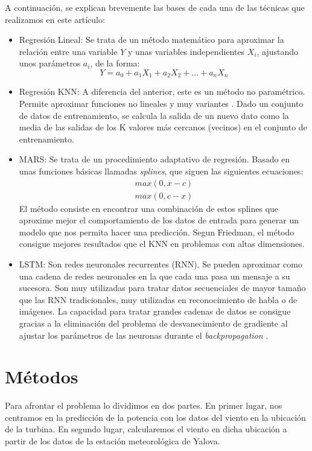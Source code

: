 \documentclass[journal]{IEEEtran}
\begin{document}
A continuación, se explican brevemente las bases de cada una de las técnicas que realizamos en este artículo:
\begin{itemize}
    \item Regresión Lineal: Se trata de un método matemático para aproximar la relación entre una variable $Y$ y unas variables independientes $X_i$, ajustando unos parámetros $a_i$, de la forma:
\begin{equation}
\label{eqn:Reg}
 Y = a_0+a_1X_1 + a_2X_2+\ldots + a_nX_n
\end{equation}

    \item Regresión KNN: A diferencia del anterior, este es un método no paramétrico. Permite aproximar funciones no lineales y muy variantes \cite{James2013}. Dado un conjunto de datos de entrenamiento, se calcula la salida de un nuevo dato como la media de las salidas de los K valores más cercanos (vecinos) en el conjunto de entrenamiento.
    \item MARS: Se trata de un procedimiento adaptativo de regresión. Basado en unas funciones básicas llamadas \emph{splines}, que siguen las siguientes ecuaciones: 
    \begin{align*} 
        max(0,x-c) \\
        max(0,c-x)
    \end{align*}
    El método consiste en encontrar una combinación de estos splines que aproxime mejor el comportamiento de los datos de entrada para generar un modelo que nos permita hacer una predicción. Segun Friedman, \cite{JHFRIEDMAN1991} el método consigue mejores resultados que el KNN en problemas con altas dimensiones.
    \item LSTM: Son redes neuronales recurrentes (RNN). Se pueden aproximar como una cadena de redes neuronales en la que cada una pasa un mensaje a su sucesora. Son muy utilizadas para tratar datos secuenciales de mayor tamaño que las RNN tradicionales, muy utilizadas en reconocimiento de habla o de imágenes. La capacidad para tratar grandes cadenas de datos se consigue gracias a la eliminación del problema de desvanecimiento de gradiente al ajustar los parámetros de las neuronas durante el \emph{backpropagation} \cite{45500}.


\end{itemize}


 


\section{Métodos}
Para afrontar el problema lo dividimos en dos partes. En primer lugar, nos centramos en la predicción de la potencia con los datos del viento en la ubicación de la turbina. En segundo lugar, calcularemos el viento en dicha ubicación a partir de los datos de la estación meteorológica de Yalova. 
\end{document}
